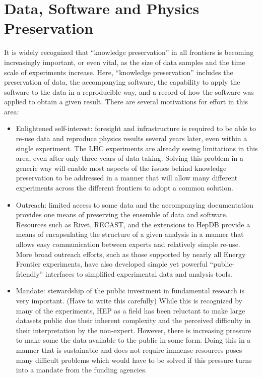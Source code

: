 \section{Data, Software and Physics Preservation}
It is widely recognized that “knowledge preservation” in all frontiers is becoming 
increasingly important, or even vital, as the size of data samples and the time 
scale of experiments increase.  Here, “knowledge preservation” includes the preservation 
of data, the accompanying software, the capability to apply the software to the data 
in a reproducible way, and a record of how the software was applied to obtain a given 
result.  There are several motivations for effort in this area:
\begin{itemize}
\item
Enlightened self-interest: foresight and infrastructure is required to be able to 
re-use data and reproduce physics results several years later, even within a single 
experiment.  The LHC experiments are already seeing limitations in this area, even 
after only three years of data-taking.  Solving this problem in a generic way will 
enable most aspects of the issues behind knowledge preservation to be addressed in 
a manner that will allow many different experiments across the different frontiers 
to adopt a common solution.
\item
Outreach: limited access to some data and the accompanying documentation provides one 
means of preserving the ensemble of data and software.  Resources such as Rivet, 
RECAST, and the extensions to HepDB provide a means of encapsulating the structure 
of a given analysis in a manner that allows easy communication between experts and 
relatively simple re-use.  More broad outreach efforts, such as those supported by 
nearly all Energy Frontier experiments, have also developed simple yet powerful 
“public-friendly” interfaces to simplified experimental data and analysis tools.
\item
Mandate: stewardship of the public investment in fundamental research is very important. 
(Have to write this carefully) While this is recognized by many of the experiments, 
HEP as a field has been reluctant to make large datasets public due their inherent 
complexity and the perceived difficulty in their interpretation by the non-expert.  
However, there is increasing pressure to make some the data available to the public 
in some form.  Doing this in a manner that is sustainable and does not require immense 
resources poses many difficult problems which would have to be solved if this pressure 
turns into a mandate from the funding agencies.
\end{itemize}


